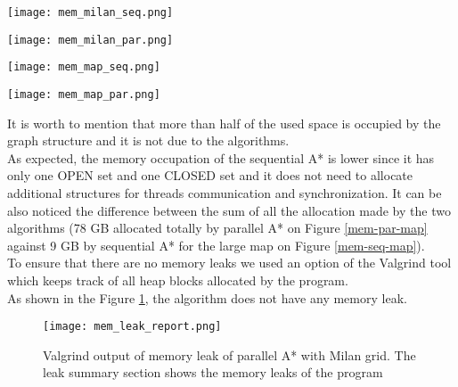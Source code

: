 \begin{center}
    \begin{minipage}[b]{0.45\textwidth}
        \texttt{[image: mem\_milan\_seq.png]}
        \label{mem-seq-milan}
    \end{minipage}
    \hspace{0.5cm}
    \begin{minipage}[b]{0.45\textwidth}
        \texttt{[image: mem\_milan\_par.png]}
        \label{mem-par-milan}
    \end{minipage}%
    
    \vspace{0.5cm}
    
    \begin{minipage}[b]{0.45\textwidth}
        \texttt{[image: mem\_map\_seq.png]}
        \label{mem-seq-map}
    \end{minipage}%
    \hspace{0.5cm}
    \begin{minipage}[b]{0.45\textwidth}
        \texttt{[image: mem\_map\_par.png]}
        \label{mem-par-map}
    \end{minipage}

\end{center}
It is worth to mention that more than half of the used space is occupied by the graph structure and it is not due to the algorithms.
\\
As expected, the memory occupation of the sequential A* is lower since it has only one OPEN set and one CLOSED set and it does not need to allocate additional structures for threads communication and synchronization.
It can be also noticed the difference between the sum of all the allocation made by the two algorithms (78 GB allocated totally by parallel A* on Figure \ref{mem-par-map} against 9 GB by sequential A* for the large map on Figure \ref{mem-seq-map}).
\\
To ensure that there are no memory leaks we used an option of the Valgrind tool which keeps track of all heap blocks allocated by the program.
\\
As shown in the Figure \ref{mem-leak-milan}, the algorithm does not have any memory leak.

\begin{figure}[h]
    \centering
    \texttt{[image: mem\_leak\_report.png]}
    \caption{Valgrind output of memory leak of parallel A* with Milan grid. The leak summary section shows the memory leaks of the program}
    \label{mem-leak-milan}
\end{figure}



